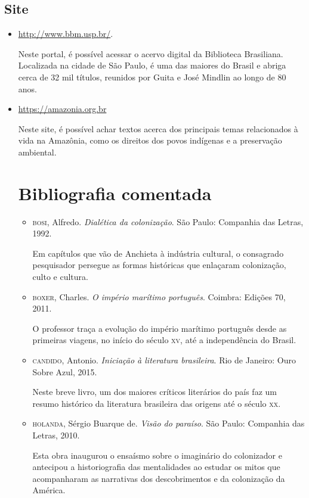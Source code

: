\documentclass[12pt]{extarticle}
\begin{document}
{\subsection{Site}

\begin{itemize}
\item\url{http://www.bbm.usp.br/}.

Neste portal, é possível acessar o acervo digital da Biblioteca
Brasiliana. Localizada na cidade de São Paulo, é uma das maiores do
Brasil e abriga cerca de 32 mil títulos, reunidos por Guita e José
Mindlin ao longo de 80 anos.

 \item\url{https://amazonia.org.br}

 Neste site, é possível achar textos acerca dos principais temas 
 relacionados à vida na Amazônia, como os direitos dos povos indígenas e
 a preservação ambiental.

\section{Bibliografia comentada}

\begin{itemize}
\item\textsc{bosi}, Alfredo. \textit{Dialética da colonização}. São Paulo: Companhia
das Letras, 1992.

Em capítulos que vão de Anchieta à indústria cultural, o consagrado
pesquisador persegue as formas históricas que enlaçaram colonização,
culto e cultura.

\item\textsc{boxer}, Charles. \textit{O império marítimo português}. Coimbra: Edições 70, 2011.

O professor traça a evolução do império marítimo português desde as
primeiras viagens, no início do século \textsc{xv}, até a independência do
Brasil.

\item\textsc{candido}, Antonio. \textit{Iniciação à literatura brasileira}. Rio de
Janeiro: Ouro Sobre Azul, 2015.

Neste breve livro, um dos maiores críticos literários do país faz um
resumo histórico da literatura brasileira das origens até o século \textsc{xx}.

\item\textsc{holanda}, Sérgio Buarque de. \textit{Visão do paraíso}. São Paulo:
Companhia das Letras, 2010.

Esta obra inaugurou o ensaísmo sobre o imaginário do colonizador e
antecipou a historiografia das mentalidades ao estudar os mitos que
acompanharam as narrativas dos descobrimentos e da colonização da
América.


\end{itemize}
\end{itemize}}
\end{document}
